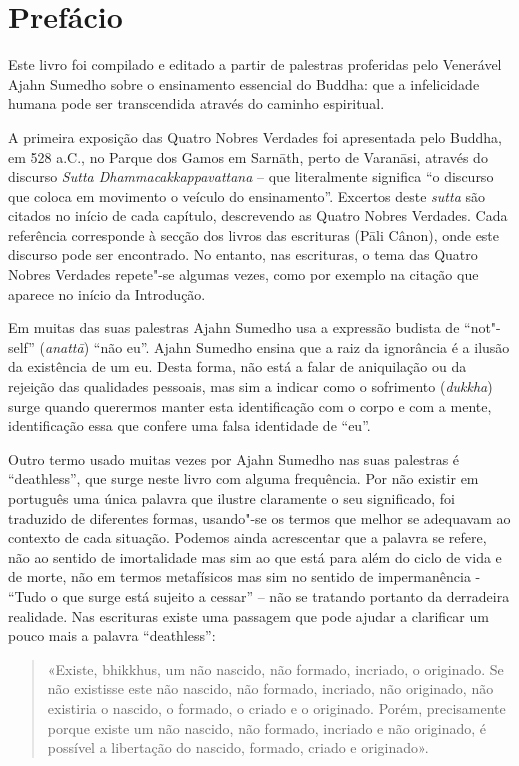 \chapter{Prefácio}

\thispagestyle{bottomcenter}

Este livro foi compilado e editado a partir de palestras proferidas pelo
Venerável Ajahn Sumedho sobre o ensinamento essencial do Buddha: que a
infelicidade humana pode ser transcendida através do caminho espiritual.

A primeira exposição das Quatro Nobres Verdades foi apresentada pelo Buddha, em
528 a.C., no Parque dos Gamos em Sarnāth, perto de Varanāsi, através do
discurso \emph{Sutta Dhammacakkappavattana} – que literalmente
significa “o discurso que coloca em movimento o veículo do ensinamento”.
Excertos deste \emph{sutta} são citados no início de cada capítulo, descrevendo
as Quatro Nobres Verdades. Cada referência corresponde à secção dos livros das
escrituras (Pāli Cânon), onde este discurso pode ser encontrado. No entanto, nas
escrituras, o tema das Quatro Nobres Verdades repete"-se algumas vezes, como por
exemplo na citação que aparece no início da Introdução.

Em muitas das suas palestras Ajahn Sumedho usa a expressão budista de “not"-self”
(\emph{anattā}) “não eu”. Ajahn Sumedho ensina que a raiz da ignorância é a
ilusão da existência de um eu. Desta forma, não está a falar de aniquilação ou
da rejeição das qualidades pessoais, mas sim a indicar como o sofrimento
(\emph{dukkha}) surge quando querermos manter esta identificação com o corpo e
com a mente, identificação essa que confere uma falsa identidade de “eu”.

Outro termo usado muitas vezes por Ajahn Sumedho nas suas palestras é
“deathless”, que surge neste livro com alguma frequência. Por não existir em
português uma única palavra que ilustre claramente o seu significado, foi
traduzido de diferentes formas, usando"-se os termos que melhor se adequavam ao
contexto de cada situação. Podemos ainda acrescentar que a palavra se refere,
não ao sentido de imortalidade mas sim ao que está para além do ciclo de
vida e de morte, não em termos metafísicos mas sim no sentido de impermanência -
“Tudo o que surge está sujeito a cessar” – não se tratando portanto da
derradeira realidade. Nas escrituras existe uma passagem que pode ajudar a
clarificar um pouco mais a palavra “deathless”:

\begin{quote}
  «Existe, bhikkhus, um não nascido, não formado, incriado, o originado. 
  Se não existisse este não nascido, não formado, incriado, não
  originado, não existiria o nascido, o formado, o criado e o originado. Porém,
  precisamente porque existe um não nascido, não formado, incriado e não
  originado, é possível a libertação do nascido, formado, criado e originado».

\end{quote}

